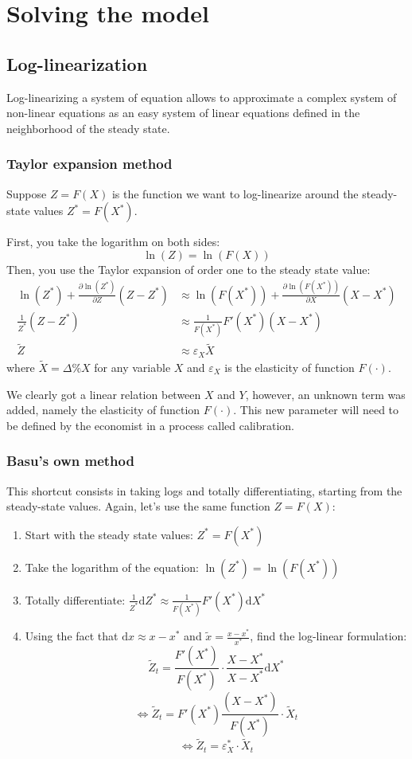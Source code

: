 \documentclass[12pt]{report}
\def\D{\mathrm{d}}
\def\D{\mathrm{d}}
\begin{document}
\section{Solving the model}

\subsection{Log-linearization}

Log-linearizing a system of equation allows to approximate a complex system of non-linear equations as an easy system of linear equations defined in the neighborhood of the steady state.

\subsubsection{Taylor expansion method}

Suppose $Z = F(X)$ is the function we want to log-linearize around the steady-state values $Z^* = F(X^*)$.

First, you take the logarithm on both sides: $$\ln(Z) = \ln(F(X))$$ Then, you use the Taylor expansion of order one to the steady state value: \begin{align*}
\ln(Z^*) + \frac{\partial\ln(Z^*)}{\partial Z} (Z - Z^*) & \approx \ln(F(X^*)) + \frac{\partial\ln(F(X^*))}{\partial X} (X - X^*) \\
\frac{1}{Z^*} (Z - Z^*) & \approx \frac{1}{F(X^*)}F'(X^*) (X - X^*) \\
\tilde Z & \approx \varepsilon_X \tilde X
\end{align*} where $\tilde{X} = \Delta\% X$ for any variable $X$ and $\varepsilon_X$ is the elasticity of function $F(\cdot)$.

We clearly got a linear relation between $X$ and $Y$, however, an unknown term was added, namely the elasticity of function $F(\cdot)$. This new parameter will need to be defined by the economist in a process called calibration.

\subsubsection{Basu's own method}

This shortcut consists in taking logs and totally differentiating, starting from the steady-state values. Again, let's use the same function $Z = F(X)$:\begin{enumerate}
\item Start with the steady state values: $Z^* = F(X^*)$
\item Take the logarithm of the equation: $\ln(Z^*) = \ln(F(X^*))$
\item Totally differentiate: $\frac{1}{Z^*}\D Z^* \approx \frac{1}{F(X^*)}F'(X^*)\D X^* $
\item Using the fact that $\D x \approx x - x^* $ and $\tilde x = \frac{x - x^*}{x^*}$, find the log-linear formulation: $$\tilde Z_t = \frac{F'(X^*)}{F(X^*)}\cdot \frac{X - X^*}{X - X^*} \D X^* $$ $$\Leftrightarrow \tilde Z_t = F'(X^*)\frac{(X - X^*)}{F(X^*)}\cdot \tilde X_t $$ $$\Leftrightarrow \tilde Z_t = \varepsilon_X^* \cdot \tilde X_t $$
\end{enumerate} 
\end{document}
